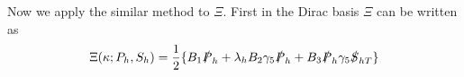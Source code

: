 Now we apply the similar method to $\Xi$. First in the Dirac basis $\Xi$ can be written as 
\begin{equation}
\Xi(\kappa;P_h,S_h)=\frac{1}{2}\{B_1\slashed{P}_h+\lambda_hB_2\gamma_5\slashed{P}_h+B_3\slashed{P}_h\gamma_5\slashed{S}_{hT}\}
\label{eqn:xi2}
\end{equation}
